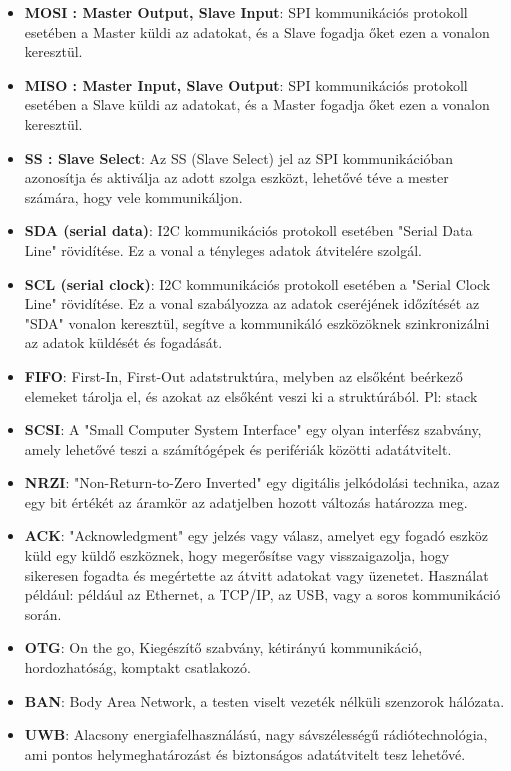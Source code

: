\begin{itemize}
    \item \textbf{MOSI : Master Output, Slave Input}: SPI kommunikációs protokoll esetében a Master küldi az adatokat, és a Slave fogadja őket ezen a vonalon keresztül.
    \item \textbf{MISO : Master Input, Slave Output}: SPI kommunikációs protokoll esetében a Slave küldi az adatokat, és a Master fogadja őket ezen a vonalon keresztül.
    \item \textbf{SS : Slave Select}: Az SS (Slave Select) jel az SPI kommunikációban azonosítja és aktiválja az adott szolga eszközt, lehetővé téve a mester számára, hogy vele kommunikáljon.
    \item \textbf{SDA (serial data)}: I2C kommunikációs protokoll esetében "Serial Data Line" rövidítése. Ez a vonal a tényleges adatok átvitelére szolgál.
    \item \textbf{SCL (serial clock)}: I2C kommunikációs protokoll esetében a "Serial Clock Line" rövidítése. Ez a vonal szabályozza az adatok cseréjének időzítését az "SDA" vonalon keresztül, segítve a kommunikáló eszközöknek szinkronizálni az adatok küldését és fogadását.
    \item \textbf{FIFO}: First-In, First-Out adatstruktúra, melyben az elsőként beérkező elemeket tárolja el, és azokat az elsőként veszi ki a struktúrából. Pl: stack
    \item \textbf{SCSI}: A "Small Computer System Interface" egy olyan interfész szabvány, amely lehetővé teszi a számítógépek és perifériák közötti adatátvitelt.
    \item \textbf{NRZI}: "Non-Return-to-Zero Inverted" egy digitális jelkódolási technika, azaz egy bit értékét az áramkör az adatjelben hozott változás határozza meg.
    \item \textbf{ACK}: "Acknowledgment" egy jelzés vagy válasz, amelyet egy fogadó eszköz küld egy küldő eszköznek, hogy megerősítse vagy visszaigazolja, hogy sikeresen fogadta és megértette az átvitt adatokat vagy üzenetet. Használat például: például az Ethernet, a TCP/IP, az USB, vagy a soros kommunikáció során.
    \item \textbf{OTG}: On the go, Kiegészítő szabvány, kétirányú kommunikáció, hordozhatóság, komptakt csatlakozó.
    \item \textbf{BAN}: Body Area Network, a testen viselt vezeték nélküli szenzorok hálózata.
    \item \textbf{UWB}: Alacsony energiafelhasználású, nagy sávszélességű rádiótechnológia, ami pontos helymeghatározást és biztonságos adatátvitelt tesz lehetővé.

\end{itemize}
